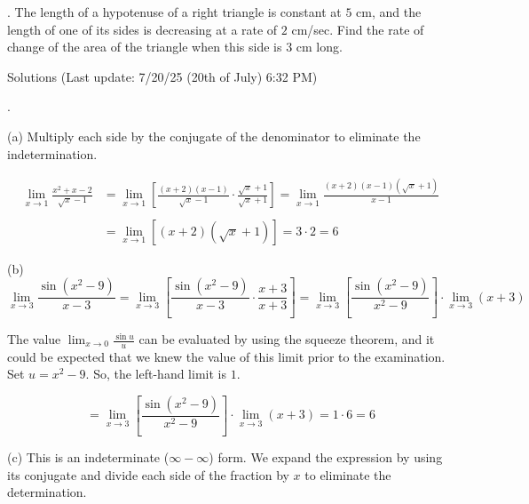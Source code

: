 \documentclass{article}
\begin{document}
\hfill

. The length of a hypotenuse of a right triangle is constant at $5$ cm, and the
length of one of its sides is decreasing at a rate of $2$ cm/sec. Find the rate of change of the area of the triangle when this side is $3$ cm long.

\newpage

\begin{center}
Solutions (Last update: 7/20/25 (20th of July) 6:32 PM)
\end{center}

.

\hfill

\noindent (a) Multiply each side by the conjugate of the denominator to eliminate the indetermination.

\begin{align*}
\lim_{x\to1}\frac{x^2+x-2}{\sqrt x -1}&=\lim_{x\to1}\left[\frac{(x+2)(x-1)}{\sqrt x -1}\cdot \frac{\sqrt x + 1}{\sqrt x +1}\right]=\lim_{x\to1}\frac{(x+2)(x-1)\left(\sqrt x + 1\right)}{x-1}\\\\&=\lim_{x\to1}\left[(x+2)\left(\sqrt x + 1\right)\right] =3\cdot 2 = \boxed6
\end{align*}

\hfill

\noindent (b)
\begin{equation*}
\lim_{x\to 3}\frac{\sin(x^2-9)}{x-3}=\lim_{x\to 3}\left[\frac{\sin(x^2-9)}{x-3}\cdot\frac{x+3}{x+3}\right]=\lim_{x\to3}\left[\frac{\sin(x^2-9)}{x^2-9}\right]\cdot\lim_{x\to 3}(x+3)
\end{equation*}

\hfill

\noindent The value $\displaystyle \lim_{x\to0}\frac{\sin u}{u}$ can be evaluated by using the squeeze theorem, and it could be expected that we knew the value of this limit prior to the examination. Set $u=x^2-9$. So, the left-hand limit is $1$.

\begin{equation*}
=\lim_{x\to3}\left[\frac{\sin(x^2-9)}{x^2-9}\right]\cdot\lim_{x\to 3}(x+3) = 1\cdot 6 = \boxed6
\end{equation*}

\hfill

\noindent (c) This is an indeterminate ($\infty - \infty$) form. We expand the expression by using its conjugate and divide each side of the fraction by $x$ to eliminate the determination.
\end{document}
